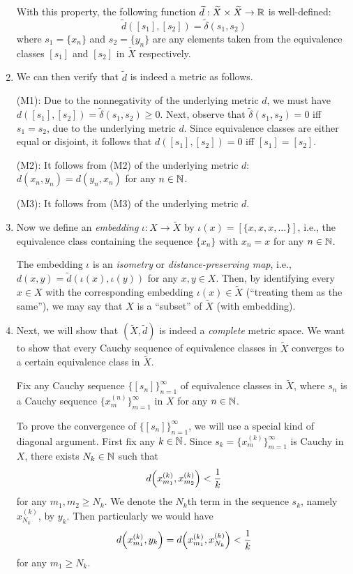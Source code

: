 \begin{enumerate}
With this property, the following function \(\widetilde{d}:\widetilde{X}\times
\widetilde{X}\to\mathbb{R}\) is well-defined:
\[
\widetilde{d}([s_1],[s_2])=\widetilde{\delta}(s_1,s_2)
\]
where \(s_1=\{x_n\}\) and \(s_2=\{y_n\}\) are any elements taken from the equivalence classes
\([s_1]\) and \([s_2]\) in \(\widetilde{X}\) respectively.


\item We can then verify that \(\widetilde{d}\) is indeed a metric as follows.

\begin{pf}
(M1): Due to the nonnegativity of the underlying metric \(d\), we must have
\(d([s_1],[s_2])=\widetilde{\delta}(s_1,s_2)\ge 0\). Next, observe that
\(\widetilde{\delta}(s_1,s_2)=0\) iff \(s_1=s_2\), due to the underlying metric
\(d\). Since equivalence classes are either equal or disjoint, it follows that
\(d([s_1],[s_2])=0\) iff \([s_1]=[s_2]\).

(M2): It follows from (M2) of the underlying metric \(d\):
\(d(x_n,y_n)=d(y_n,x_n)\) for any \(n\in\mathbb{N}\).

(M3): It follows from (M3) of the underlying metric \(d\).
\end{pf}

\item Now we define an \emph{embedding} \(\iota:X\to\widetilde{X}\) by
\(\iota(x)=[\{x,x,x,\dotsc\}]\), i.e., the equivalence class containing the
sequence \(\{x_n\}\) with \(x_n=x\) for any \(n\in\mathbb{N}\).

The embedding \(\iota\) is an \emph{isometry} or \emph{distance-preserving
map}, i.e., \(d(x,y)=\widetilde{d}(\iota(x),\iota(y))\) for any \(x,y\in X\).
Then, by identifying every \(x\in X\) with the corresponding embedding
\(\iota(x)\in\widetilde{X}\) (``treating them as the same''), we may say that
\(X\) is a ``subset'' of \(\widetilde{X}\) (with embedding).

\item Next, we will show that \((\widetilde{X},\widetilde{d})\) is indeed a
\emph{complete} metric space. We want to show that every Cauchy sequence of
equivalence classes in \(\widetilde{X}\) converges to a certain equivalence class in
\(\widetilde{X}\).

Fix any Cauchy sequence \(\{[s_n]\}_{n=1}^{\infty}\) of equivalence classes in
\(\widetilde{X}\), where \(s_n\) is a Cauchy sequence
\(\{x_m^{(n)}\}_{m=1}^{\infty}\) in \(X\) for any \(n\in\mathbb{N}\).

To prove the convergence of \(\{[s_n]\}_{n=1}^{\infty}\), we will use a special
kind of diagonal argument.  First fix any \(k\in\mathbb{N}\). Since
\(s_k=\{x_m^{(k)}\}_{m=1}^{\infty}\) is Cauchy in \(X\), there exists
\(N_k\in\mathbb{N}\) such that
\[
d\qty(x_{m_1}^{(k)},x_{m_2}^{(k)})<\frac{1}{k}
\]
for any \(m_1,m_2\ge N_k\). We denote the \(N_k\)th term in the sequence
\(s_k\), namely \(x_{N_k}^{(k)}\), by \(y_k\). Then particularly we would have
\begin{equation}
\label{eq:completion-dxky}
d\qty(x_{m_1}^{(k)},y_k)=d\qty(x_{m_1}^{(k)},x_{N_k}^{(k)})<\frac{1}{k}
\end{equation}
for any \(m_1\ge N_k\).


\end{enumerate}
